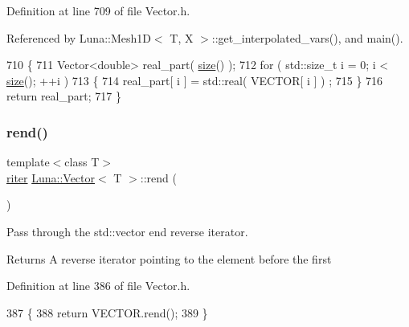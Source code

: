 Definition at line 709 of file Vector.\+h.



Referenced by Luna\+::\+Mesh1\+D$<$ T, X $>$\+::get\+\_\+interpolated\+\_\+vars(), and main().


\begin{DoxyCode}
710   \{
711     Vector<double> real\_part( \hyperlink{classLuna_1_1Vector_ac9b6ed7a0df401728f27c193fbc8f4d8}{size}() );
712     \textcolor{keywordflow}{for} ( std::size\_t i = 0; i < \hyperlink{classLuna_1_1Vector_ac9b6ed7a0df401728f27c193fbc8f4d8}{size}(); ++i )
713     \{
714       real\_part[ i ] = std::real( VECTOR[ i ] ) ;
715     \}
716     \textcolor{keywordflow}{return} real\_part;
717   \}
\end{DoxyCode}
\mbox{\label{classLuna_1_1Vector_a830d3e3c9668a6e112086feeb06516e4}} 
\subsubsection{\texorpdfstring{rend()}{rend()}\hspace{0.1cm}{\footnotesize\ttfamily [1/2]}}
{\footnotesize\ttfamily template$<$class T$>$ \\
\hyperlink{classLuna_1_1Vector_a6db6c6b09df2c68bbfd1960c56bb20d5}{riter} \hyperlink{classLuna_1_1Vector}{Luna\+::\+Vector}$<$ T $>$\+::rend (\begin{DoxyParamCaption}{ }\end{DoxyParamCaption})\hspace{0.3cm}{\ttfamily [inline]}}



Pass through the std\+::vector end reverse iterator. 

\begin{DoxyReturn}{Returns}
A reverse iterator pointing to the element before the first 
\end{DoxyReturn}


Definition at line 386 of file Vector.\+h.


\begin{DoxyCode}
387     \{
388       \textcolor{keywordflow}{return} VECTOR.rend();
389     \}
\end{DoxyCode}
\mbox{\label{classLuna_1_1Vector_a8be51612ac896a7c9fde8479332c6a91}} 
